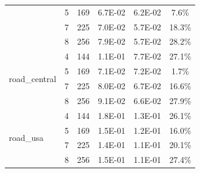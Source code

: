 \documentclass[conference, 10ppt]{IEEEtran}
\begin{document}
\begin{table}[htb]
\begin{tabular}[c]{| l | c | c | c | c | c |}
  &  5  &  169  &  6.7E-02  &  6.2E-02  &  7.6\% \\ \cline{2-6}
  &  7  &  225  &  7.0E-02  &  5.7E-02  &  18.3\% \\ \cline{2-6}
  &  8  &  256  &  7.9E-02  &  5.7E-02  &  28.2\% \\ \hline
\multirow{4}{*}{road\_central}  &  4  &  144  &  1.1E-01  &  7.7E-02  &  27.1\% \\ \cline{2-6}
  &  5  &  169  &  7.1E-02  &  7.2E-02  &  1.7\% \\ \cline{2-6}
  &  7  &  225  &  8.0E-02  &  6.7E-02  &  16.6\% \\ \cline{2-6}
  &  8  &  256  &  9.1E-02  &  6.6E-02  &  27.9\% \\ \hline
\multirow{4}{*}{road\_usa}  &  4  &  144  &  1.8E-01  &  1.3E-01  &  26.1\% \\ \cline{2-6}
  &  5  &  169  &  1.5E-01  &  1.2E-01  &  16.0\% \\ \cline{2-6}
  &  7  &  225  &  1.4E-01  &  1.1E-01  &  20.1\% \\ \cline{2-6}
  &  8  &  256  &  1.5E-01  &  1.1E-01  &  27.4\% \\ \hline
\end{tabular}
\end{table}




\end{document}
